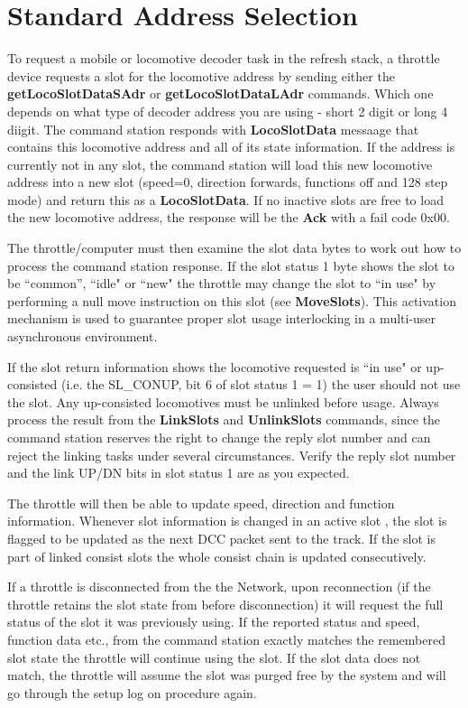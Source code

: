 \section{Standard Address Selection}

To request a mobile or locomotive decoder task in the refresh stack, a throttle device requests a slot for the locomotive address by sending either the \textbf{getLocoSlotDataSAdr} or \textbf{getLocoSlotDataLAdr} commands. Which one depends on what type of decoder address you are using - short 2 digit or long 4 diigit. The command station responds with \textbf{LocoSlotData} messaage that contains this locomotive address and all of its state information. If the address is currently not in any slot, the command station will load this new locomotive address into a new slot (speed=0, direction forwards, functions off and 128 step mode) and return this as a \textbf{LocoSlotData}. If no inactive slots are free to load the new locomotive address, the response will be the \textbf{Ack} with a fail code 0x00.

The throttle/computer must then examine the slot data bytes to work out how to process the command station response. If the slot status 1 byte shows the slot to be ``common'', ``idle" or ``new" the throttle may change the slot to ``in use" by performing a null move instruction on this slot (see \textbf{MoveSlots}). This activation mechanism is used to guarantee proper slot usage interlocking in a multi-user asynchronous environment.

If the slot return information shows the locomotive requested is ``in use" or up-consisted (i.e. the SL\_CONUP, bit 6 of slot status 1 = 1) the user should not use the slot. Any up-consisted locomotives must be unlinked before usage. Always process the result from the \textbf{LinkSlots} and \textbf{UnlinkSlots} commands, since the command station reserves the right to change the reply slot number and can reject the linking tasks under several circumstances. Verify the reply slot number and the link UP/DN bits in slot status 1 are as you expected.

The throttle will then be able to update speed, direction and function information. Whenever slot information is changed in an active slot , the slot is flagged to be updated as the next DCC packet sent to the track. If the slot is part of linked consist slots the whole consist chain is updated consecutively.

If a throttle is disconnected from the the Network, upon reconnection (if the throttle retains the slot state from before disconnection) it will request the full status of the slot it was previously using. If the reported status and speed, function data etc., from the command station exactly matches the remembered slot state the throttle will continue using the slot. If the slot data does not match, the throttle will assume the slot was purged free by the system and will go through the setup log on procedure again.

